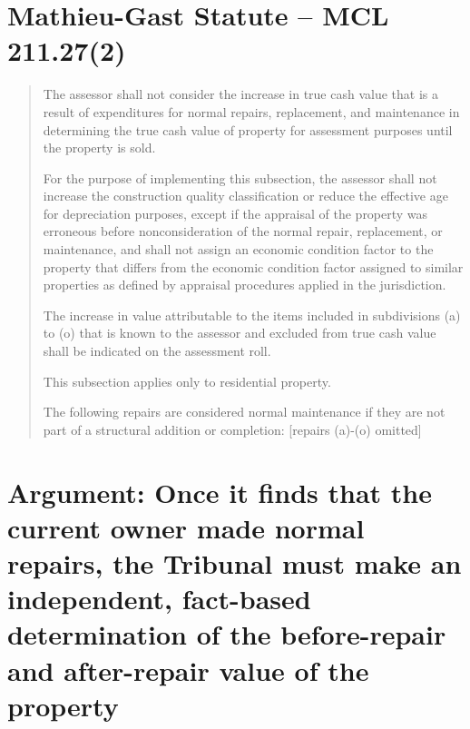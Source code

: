 \documentclass[12pt,\documentclassflag]{michiganCourtOfAppealsBrief}
\begin{document}
\section{Mathieu-Gast Statute -- MCL 211.27(2)}
\begin{quotation}
The assessor shall not consider the increase in true cash value that is a result of expenditures for normal repairs, replacement, and maintenance in determining the true cash value of property for assessment purposes until the property is sold.

For the purpose of implementing this subsection, the assessor shall not increase the construction quality classification or reduce the effective age for depreciation purposes, except if the appraisal of the property was erroneous before nonconsideration of the normal repair, replacement, or maintenance, and shall not assign an economic condition factor to the property that differs from the economic condition factor assigned to similar properties as defined by appraisal procedures applied in the jurisdiction.

The increase in value attributable to the items included in subdivisions (a) to (o) that is known to the assessor and excluded from true cash value shall be indicated on the assessment roll.

This subsection applies only to residential property.

The following repairs are considered normal maintenance if they are not part of a structural addition or completion: [repairs (a)-(o) omitted]

\end{quotation}


\section{Argument: Once it finds that the current owner made normal repairs, the Tribunal must make an independent, fact-based determination of the before-repair and after-repair value of the property}
\end{document}

